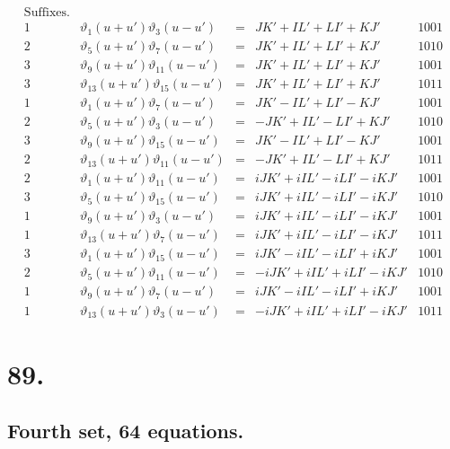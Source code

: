 \documentclass[11pt,a4paper]{article}
\newcommand{\uth}[1]{\vartheta_{#1}}
\begin{document}
\[
\begin{array}{ccccc}
\text{Suffixes.} & & & & \\
\hline
1 & \uth{1}(u+u')\uth{3}(u-u') &=& JK' + IL' + LI' + KJ' & 1001 \\
2 & \uth{5}(u+u')\uth{7}(u-u') &=& JK' + IL' + LI' + KJ' & 1010 \\
3 & \uth{9}(u+u')\uth{11}(u-u') &=& JK' + IL' + LI' + KJ' & 1001 \\
3 & \uth{13}(u+u')\uth{15}(u-u') &=& JK' + IL' + LI' + KJ' & 1011 \\
\hline
1 & \uth{1}(u+u')\uth{7}(u-u') &=& JK' - IL' + LI' - KJ' & 1001 \\
2 & \uth{5}(u+u')\uth{3}(u-u') &=& -JK' + IL' - LI' + KJ' & 1010 \\
3 & \uth{9}(u+u')\uth{15}(u-u') &=& JK' - IL' + LI' - KJ' & 1001 \\
2 & \uth{13}(u+u')\uth{11}(u-u') &=& -JK' + IL' - LI' + KJ' & 1011 \\
\hline
2 & \uth{1}(u+u')\uth{11}(u-u') &=& iJK' + iIL' - iLI' - iKJ' & 1001 \\
3 & \uth{5}(u+u')\uth{15}(u-u') &=& iJK' + iIL' - iLI' - iKJ' & 1010 \\
1 & \uth{9}(u+u')\uth{3}(u-u') &=& iJK' + iIL' - iLI' - iKJ' & 1001 \\
1 & \uth{13}(u+u')\uth{7}(u-u') &=& iJK' + iIL' - iLI' - iKJ' & 1011 \\
\hline
3 & \uth{1}(u+u')\uth{15}(u-u') &=& iJK' - iIL' - iLI' + iKJ' & 1001 \\
2 & \uth{5}(u+u')\uth{11}(u-u') &=& -iJK' + iIL' + iLI' - iKJ' & 1010 \\
1 & \uth{9}(u+u')\uth{7}(u-u') &=& iJK' - iIL' - iLI' + iKJ' & 1001 \\
1 & \uth{13}(u+u')\uth{3}(u-u') &=& -iJK' + iIL' + iLI' - iKJ' & 1011
\end{array}
\]

\newpage
\section*{89.}
\label{sec:89}

\subsection*{Fourth set, 64 equations.}
\end{document}
